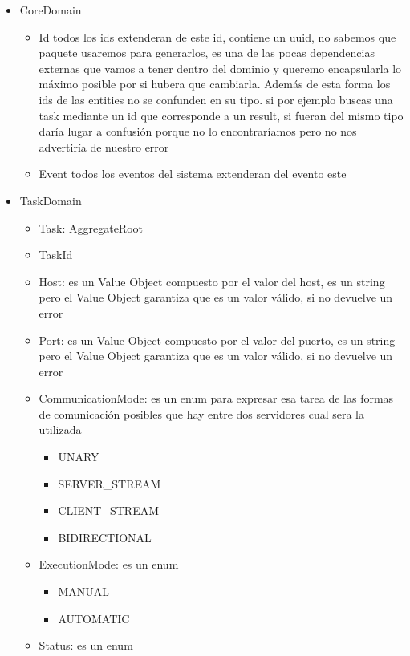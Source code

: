 \begin{itemize}
    \item CoreDomain
    \begin{itemize}
        \item Id todos los ids extenderan de este id, contiene un uuid, no sabemos que paquete usaremos para generarlos, es una de las pocas dependencias externas que vamos a tener dentro del dominio y queremo encapsularla lo máximo posible por si hubera que cambiarla. Además de esta forma los ids de las entities no se confunden en su tipo. si por ejemplo buscas una task mediante un id que corresponde a un result, si fueran del mismo tipo daría lugar a confusión porque no lo encontraríamos pero no nos advertiría de nuestro error
        \item Event todos los eventos del sistema extenderan del evento este
    \end{itemize}
    \item TaskDomain
    \begin{itemize}
        \item Task: AggregateRoot
        \item TaskId
        \item Host: es un Value Object compuesto por el valor del host, es un string pero el Value Object garantiza que es un valor válido, si no devuelve un error
        \item Port: es un Value Object compuesto por el valor del puerto, es un string pero el Value Object garantiza que es un valor válido, si no devuelve un error
        \item CommunicationMode: es un enum para expresar esa tarea de las formas de comunicación posibles que hay entre dos servidores cual sera la utilizada
        \begin{itemize}
            \item UNARY
            \item SERVER\_STREAM
            \item CLIENT\_STREAM
            \item BIDIRECTIONAL
        \end{itemize}
        \item ExecutionMode: es un enum
        \begin{itemize}
            \item MANUAL
            \item AUTOMATIC
        \end{itemize}
        \item Status: es un enum

\end{itemize}
\end{itemize}
